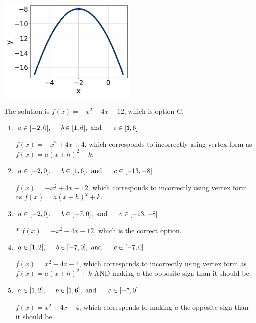 \documentclass{extbook}[14pt]
\begin{document}
\begin{enumerate}
{\begin{center}
    \includegraphics[width=0.5\textwidth]{../Figures/quadraticGraphToEquationCopyC.png}
\end{center}


The solution is \( f(x) = -x^{2} -4 x -12 \), which is option C.\begin{enumerate}[label=\Alph*.]
\item \( a \in [-2, 0], \hspace*{5mm} b \in [1, 6], \text{ and } \hspace*{5mm} c \in [3, 6] \)

$f(x)=-x^{2} +4 x + 4$, which corresponds to incorrectly using vertex form as $f(x) = a(x+h)^2 - k$.
\item \( a \in [-2, 0], \hspace*{5mm} b \in [1, 6], \text{ and } \hspace*{5mm} c \in [-13, -8] \)

$f(x)=-x^{2} +4 x -12$, which corresponds to incorrectly using vertex form as $f(x) = a(x+h)^2+k$.
\item \( a \in [-2, 0], \hspace*{5mm} b \in [-7, 0], \text{ and } \hspace*{5mm} c \in [-13, -8] \)

* $f(x)=-x^{2} -4 x -12$, which is the correct option.
\item \( a \in [1, 2], \hspace*{5mm} b \in [-7, 0], \text{ and } \hspace*{5mm} c \in [-7, 0] \)

$f(x)=x^{2} -4 x -4$, which corresponds to incorrectly using vertex form as $f(x) = a(x+h)^2+k$ AND making $a$ the opposite sign than it should be.
\item \( a \in [1, 2], \hspace*{5mm} b \in [1, 6], \text{ and } \hspace*{5mm} c \in [-7, 0] \)

$f(x)=x^{2} +4 x -4$, which corresponds to making $a$ the opposite sign than it should be.
\end{enumerate}

}
\end{enumerate}
\end{document}
